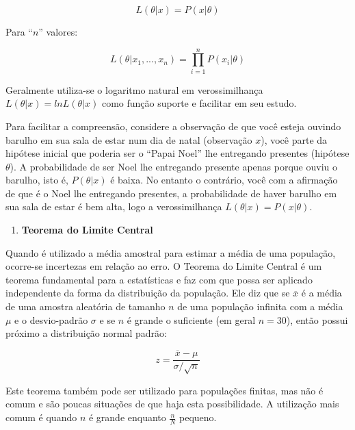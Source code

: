 \documentclass[
  openany]{book}
\providecommand{\tightlist}{%
  \setlength{\itemsep}{0pt}\setlength{\parskip}{0pt}}
\begin{document}
\begin{equation} 
 L(\theta |x)=P(x| \theta)
  \label{eq:fverossimilhanca}
\end{equation}

Para ``\(n\)'' valores:

\begin{equation} 
 L(\theta |x_1,..., x_n)=\prod_{i=1}^{n} P(x_i| \theta)
  \label{eq:fsumverossimilhanca}
\end{equation}

Geralmente utiliza-se o logaritmo natural em verossimilhança \(L(\theta |x)=ln L(\theta|x)\) como função suporte e facilitar em seu estudo.

Para facilitar a compreensão, considere a observação de que você esteja ouvindo barulho em sua sala de estar num dia de natal (observação \(x\)), você parte da hipótese inicial que poderia ser o ``Papai Noel'' lhe entregando presentes (hipótese \(\theta\)). A probabilidade de ser Noel lhe entregando presente apenas porque ouviu o barulho, isto é, \(P(\theta|x)\) é baixa. No entanto o contrário, você com a afirmação de que é o Noel lhe entregando presentes, a probabilidade de haver barulho em sua sala de estar é bem alta, logo a verossimilhança \(L(\theta|x)=P(x|\theta)\).

\begin{enumerate}
\def\labelenumi{\arabic{enumi}.}
\setcounter{enumi}{10}
\tightlist
\item
  \textbf{Teorema do Limite Central}
\end{enumerate}

Quando é utilizado a média amostral para estimar a média de uma população, ocorre-se incertezas em relação ao erro. O Teorema do Limite Central é um teorema fundamental para a estatísticas e faz com que possa ser aplicado independente da forma da distribuição da população. Ele diz que se \(\overline{x}\) é a média de uma amostra aleatória de tamanho \(n\) de uma população infinita com a média \(\mu\) e o desvio-padrão \(\sigma\) e se \(n\) é grande o suficiente (em geral \(n=30\)), então possui próximo a distribuição normal padrão:

\begin{equation} 
 z=\frac{\overline{x}-\mu}{\sigma / \sqrt{n}}
  \label{eq:teoremacentralimite}
\end{equation}

Este teorema também pode ser utilizado para populações finitas, mas não é comum e são poucas situações de que haja esta possibilidade. A utilização mais comum é quando \(n\) é grande enquanto \(\frac{n}{N}\) pequeno.
\end{document}
